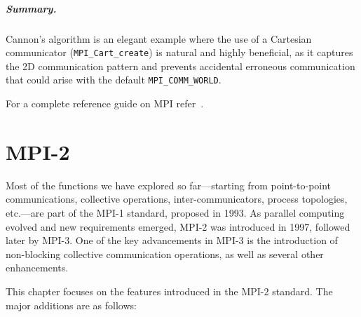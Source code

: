 \documentclass[12pt]{book}
\begin{document}
\paragraph{Summary.}  
Cannon's algorithm is an elegant example where the use of a Cartesian communicator (\texttt{MPI\_Cart\_create}) is natural and highly beneficial, as it captures the 2D communication pattern and prevents accidental erroneous communication that could arise with the default \texttt{MPI\_COMM\_WORLD}.

For a complete reference guide on MPI refer~\cite{snir1998mpi}.

\chapter{MPI-2}

Most of the functions we have explored so far---starting from point-to-point communications, collective operations, inter-communicators, process topologies, etc.---are part of the MPI-1 standard, proposed in 1993. As parallel computing evolved and new requirements emerged, MPI-2 was introduced in 1997, followed later by MPI-3. One of the key advancements in MPI-3 is the introduction of non-blocking collective communication operations, as well as several other enhancements.

This chapter focuses on the features introduced in the MPI-2 standard. The major additions are as follows:
\end{document}
